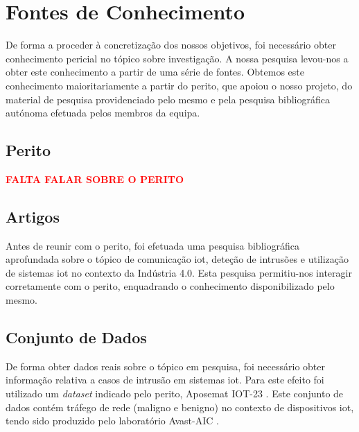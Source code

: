 
\section{Fontes de Conhecimento}

De forma a proceder à concretização dos nossos objetivos, foi necessário obter conhecimento pericial no tópico sobre investigação. A nossa pesquisa levou-nos a obter este conhecimento a partir de uma série de fontes. Obtemos este conhecimento maioritariamente a partir do perito, que apoiou o nosso projeto, do material de pesquisa providenciado pelo mesmo e pela pesquisa bibliográfica autónoma efetuada pelos membros da equipa.

\subsection{Perito}

\textcolor{red}{\textbf{FALTA FALAR SOBRE O PERITO}}

\subsection{Artigos}

Antes de reunir com o perito, foi efetuada uma pesquisa bibliográfica aprofundada sobre o tópico de comunicação \acrshort{iot}, deteção de intrusões e utilização de sistemas \acrshort{iot} no contexto da Indústria 4.0. Esta pesquisa permitiu-nos interagir corretamente com o perito, enquadrando o conhecimento disponibilizado pelo mesmo.

\subsection{Conjunto de Dados}

De forma obter dados reais sobre o tópico em pesquisa, foi necessário obter informação relativa a casos de intrusão em sistemas \acrshort{iot}. Para este efeito foi utilizado um \textit{dataset} indicado pelo perito, Aposemat IOT-23 \parencite{sebastian_garcia_2020_4743746}. Este conjunto de dados contém tráfego de rede (maligno e benigno) no contexto de dispositivos \acrshort{iot}, tendo sido produzido pelo laboratório Avast-AIC \parencite{sebastian_garcia_2020_4743746}.